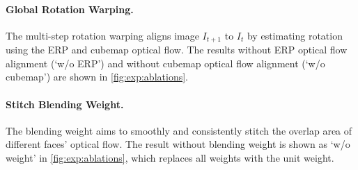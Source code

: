 \paragraph{Global Rotation Warping.}
The multi-step rotation warping aligns image $I_{t+1}$ to $I_t$ by estimating rotation using the ERP and cubemap optical flow.
The results without ERP optical flow alignment (`w/o ERP') and without cubemap optical flow alignment (`w/o cubemap') are shown in \cref{fig:exp:ablations}.


\paragraph{Stitch Blending Weight.}
The blending weight aims to smoothly and consistently stitch the overlap area of different faces' optical flow.
The result without blending weight is shown as `w/o weight' in \cref{fig:exp:ablations}, which replaces all weights with the unit weight.


